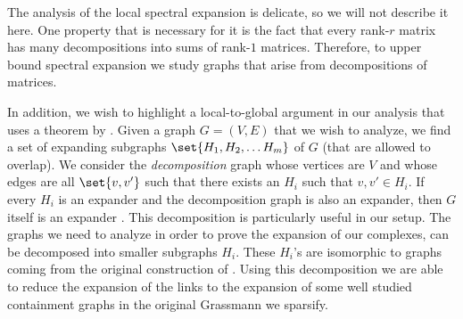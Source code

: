 The analysis of the local spectral expansion is delicate, so we will not describe it here. One property that is necessary for it is the fact that every rank-\(r\) matrix has many decompositions into sums of rank-\(1\) matrices. Therefore, to upper bound spectral expansion we study graphs that arise from decompositions of matrices.

In addition, we wish to highlight a local-to-global argument in our analysis that uses a theorem by \cite{Madras2002}. Given a graph \(G = (V,E)\) that we wish to analyze, we find a set of expanding subgraphs \( \set{H_1, H_2, \dots H_m}\) of \(G\) (that are allowed to overlap). We consider the \emph{decomposition} graph whose vertices are \(V\) and whose edges are all \(\set{v,v'}\) such that there exists an \(H_i\) such that \(v,v' \in H_i\). If every \(H_i\) is an expander and the decomposition graph is also an expander, then \(G\) itself is an expander \cite{Madras2002}.
%
This decomposition is particularly useful in our setup. The graphs we need to analyze in order to prove the expansion of our complexes, can be decomposed into smaller subgraphs \(H_i\). These \(H_i\)'s are isomorphic to graphs coming from the original construction of \cite{Golowich2023}. Using this decomposition we are able to reduce the expansion of the links to the expansion of some well studied containment graphs in the original Grassmann we sparsify.

